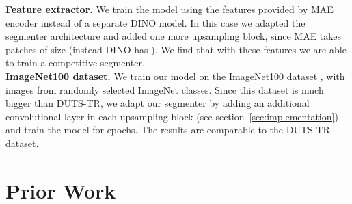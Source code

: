 \documentclass{article}
\begin{document}
\textbf{Feature extractor.} We train the model using the features provided by MAE encoder instead of a separate DINO model. In this case we adapted the segmenter architecture and added one more upsampling block, since MAE takes patches of size  (instead DINO has ). We find that with these features we are able to train a competitive segmenter. \\
\textbf{ImageNet100 dataset.} We train our model on the ImageNet100 dataset \cite{tian2020contrastive}, with  images from  randomly selected ImageNet \cite{imagenet} classes. Since this dataset is much bigger than DUTS-TR, we adapt our segmenter by adding an additional convolutional layer in each upsampling block (see section~\ref{sec:implementation}) and train the model for  epochs. The results are comparable to the DUTS-TR dataset.


\section{Prior Work}
\end{document}
